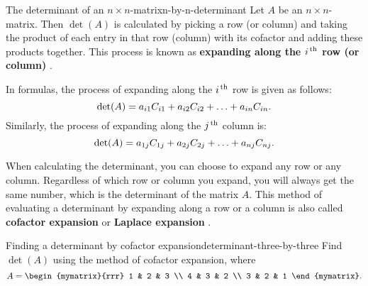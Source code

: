 \begin{definition}{The determinant of an $n\times n$-matrix}{n-by-n-determinant}
  Let $A$ be an $n\times n$-matrix. Then $\det(A)$ is calculated by
  picking a row (or column) and taking the product of each entry in
  that row (column) with its cofactor and adding these products
  together. This process is known as \textbf{expanding along the
    $i\th$ row (or column)}%
  .
  \bigskip

  In formulas, the process of expanding along the $i\th$ row is given
  as follows:
  \begin{equation*}
    \det(A) =
    a_{i1}\cofactor{A}{i1} + a_{i2}\cofactor{A}{i2} + \ldots + a_{in}\cofactor{A}{in}.
  \end{equation*}
  Similarly, the process of expanding along the $j\th$ column is:
  \begin{equation*}
    \det(A) =
    a_{1j}\cofactor{A}{1j} + a_{2j}\cofactor{A}{2j} + \ldots + a_{nj}\cofactor{A}{nj}.
  \end{equation*}

\end{definition}

When calculating the determinant, you can choose to expand any row or
any column. Regardless of which row or column you expand, you will
always get the same number, which is the determinant of the matrix
$A$.  This method of evaluating a determinant by expanding along a row
or a column is also called \textbf{cofactor expansion}%
%
 or \textbf{Laplace expansion}%
%
.

\begin{example}{Finding a determinant by cofactor expansion}{determinant-three-by-three}
  Find $\det(A)$ using the method of cofactor expansion, where
  \begin{equation*}
    A = \begin{mymatrix}{rrr}
      1 & 2 & 3 \\
      4 & 3 & 2 \\
      3 & 2 & 1
    \end{mymatrix}.
  \end{equation*}
\end{example}

